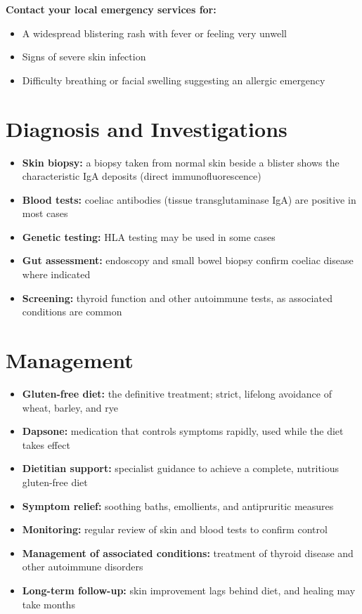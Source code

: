 \textbf{Contact your local emergency services for:}
\begin{itemize}
    \item A widespread blistering rash with fever or feeling very unwell
    \item Signs of severe skin infection
    \item Difficulty breathing or facial swelling suggesting an allergic emergency
\end{itemize}

\section*{Diagnosis and Investigations}
\begin{itemize}
    \item \textbf{Skin biopsy:} a biopsy taken from normal skin beside a blister shows the characteristic IgA deposits (direct immunofluorescence)
    \item \textbf{Blood tests:} coeliac antibodies (tissue transglutaminase IgA) are positive in most cases
    \item \textbf{Genetic testing:} HLA testing may be used in some cases
    \item \textbf{Gut assessment:} endoscopy and small bowel biopsy confirm coeliac disease where indicated
    \item \textbf{Screening:} thyroid function and other autoimmune tests, as associated conditions are common
\end{itemize}

\section*{Management}
\begin{itemize}
    \item \textbf{Gluten-free diet:} the definitive treatment; strict, lifelong avoidance of wheat, barley, and rye
    \item \textbf{Dapsone:} medication that controls symptoms rapidly, used while the diet takes effect
    \item \textbf{Dietitian support:} specialist guidance to achieve a complete, nutritious gluten-free diet
    \item \textbf{Symptom relief:} soothing baths, emollients, and antipruritic measures
    \item \textbf{Monitoring:} regular review of skin and blood tests to confirm control
    \item \textbf{Management of associated conditions:} treatment of thyroid disease and other autoimmune disorders
    \item \textbf{Long-term follow-up:} skin improvement lags behind diet, and healing may take months
\end{itemize}

